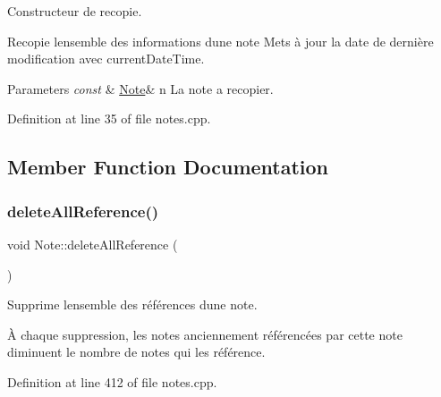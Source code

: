 Constructeur de recopie. 

Recopie l\textquotesingle{}ensemble des informations d\textquotesingle{}une note Mets à jour la date de dernière modification avec current\+Date\+Time. 
\begin{DoxyParams}{Parameters}
{\em const} & \hyperlink{class_note}{Note}\& n La note a recopier. \\
\hline
\end{DoxyParams}


Definition at line 35 of file notes.\+cpp.



\subsection{Member Function Documentation}
\mbox{\label{class_note_aacbb89b120107a4b25dd16043908c693}} 
\subsubsection{\texorpdfstring{delete\+All\+Reference()}{deleteAllReference()}}
{\footnotesize\ttfamily void Note\+::delete\+All\+Reference (\begin{DoxyParamCaption}{ }\end{DoxyParamCaption})}



Supprime l\textquotesingle{}ensemble des références d\textquotesingle{}une note. 

À chaque suppression, les notes anciennement référencées par cette note diminuent le nombre de notes qui les référence. 

Definition at line 412 of file notes.\+cpp.

